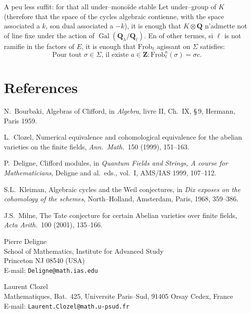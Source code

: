 \documentclass[11pt,a4paper]{article}
\theoremstyle{plain}
\theoremstyle{definition}
\DeclareMathOperator{\Gal}{Gal}
\begin{document}
A peu less suffit: for that all under--mono\"ide stable Let under--group of $K$ (therefore that the space of the cycles algebraic contienne, with the space associated a $k$, son dual associated a $-k$), it is enough that $K \otimes \mathbf{Q}$ n'admette not of line fixe under the action of $\Gal(\mathbf{Q}_\lambda/\mathbf{Q}_\ell)$. En of other termes, si $\ell$ is not ramifie in the factors of $E$, it is enough that $\mathrm{Frob}_\ell$ agissant on $\Sigma$ satisfies:
\[
\text{Pour tout } \sigma \in \Sigma\text{, il existe } a \in \mathbf{Z} : \mathrm{Frob}_\ell^a(\sigma) = \sigma c .
\]

\section*{References}

\begin{enumerate}[label={[\arabic*]}]
\item N.\ Bourbaki, Algebras of Clifford, in \textit{Algebra}, livre II, Ch.~IX, \S\,9, Hermann, Paris 1959.
\item L.\ Clozel, Numerical equivalence and cohomological equivalence for the abelian varieties on the finite fields, \textit{Ann.\ Math.}\ 150 (1999), 151--163.
\item P.\ Deligne, Clifford modules, in \textit{Quantum Fields and Strings, A course for Mathematicians}, Deligne and al.\ eds., vol.~I, AMS/IAS 1999, 107--112.
\item S.L.\ Kleiman, Algebraic cycles and the Weil conjectures, in \textit{Dix exposes on the cohomology of the schemes}, North--Holland, Amsterdam, Paris, 1968, 359--386.
\item J.S.\ Milne, The Tate conjecture for certain Abelian varieties over finite fields, \textit{Acta Arith.}\ 100 (2001), 135--166.
\end{enumerate}

\vspace{1em}

\noindent
Pierre Deligne\\
School of Mathematics, Institute for Advanced Study\\
Princeton NJ 08540 (USA)\\
E-mail: \texttt{Deligne@math.ias.edu}

\vspace{0.5em}

\noindent
Laurent Clozel\\
Mathematiques, Bat.~425, Universite Paris--Sud, 91405 Orsay Cedex, France\\
E-mail: \texttt{Laurent.Clozel@math.u-psud.fr}
\end{document}

